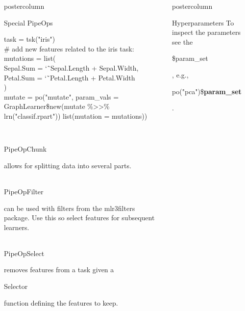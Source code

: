 \documentclass{beamer}
\newlength{\columnheight} %
\newcommand{\codeinline}[1]{\begin{codeboxinline}#1\end{codeboxinline}}
\begin{document}
\begin{frame}[fragile]{}
\begin{columns}
\begin{column}{.245\textwidth}
\begin{beamercolorbox}[center]{postercolumn}
\begin{minipage}{.98\textwidth}
{\begin{myblock}{Special PipeOps}
\begin{codeboxexample}
{                  task = tsk("iris")\\
                  \# add new features related to the iris task:\\
                  mutations = list(\\
                  \hspace*{1ex} Sepal.Sum = \char`\~ \ Sepal.Length + Sepal.Width,\\
                  \hspace*{1ex} Petal.Sum = \char`\~ \ Petal.Length + Petal.Width\\
                  )\\
                  mutate = po("mutate", param\_vals =\\
                  GraphLearner\$new(mutate \%>{}>\% lrn("classif.rpart"))
                  \hspace*{1ex} list(mutation = mutations))}
                \end{codeboxexample}
                \ \\
                \codeinline{PipeOpChunk} allows for splitting data into several parts.\\
                \ \\
                \codeinline{PipeOpFilter} can be used with filters from the mlr3filters package. Use this so select features for subsequent learners.\\
                \ \\
                \codeinline{PipeOpSelect} removes features from a task given a \codeinline{Selector} function defining the features to keep.
              \end{myblock}
           	\vfill}
				\end{minipage}
			\end{beamercolorbox}
		\end{column}
    \begin{column}{.245\textwidth}
			\begin{beamercolorbox}[center]{postercolumn}
				\begin{minipage}{.98\textwidth}
					\parbox[t][\columnheight]{\textwidth}{
            \begin{myblock}{Hyperparameters}
              To inspect the parameters see the \codeinline{\$param\_set}, e.g., \codeinline{po("pca")\$\textbf{param\_set}}.\\

\end{myblock}}
\end{minipage}
\end{beamercolorbox}
\end{column}
\end{columns}
\end{frame}
\end{document}
